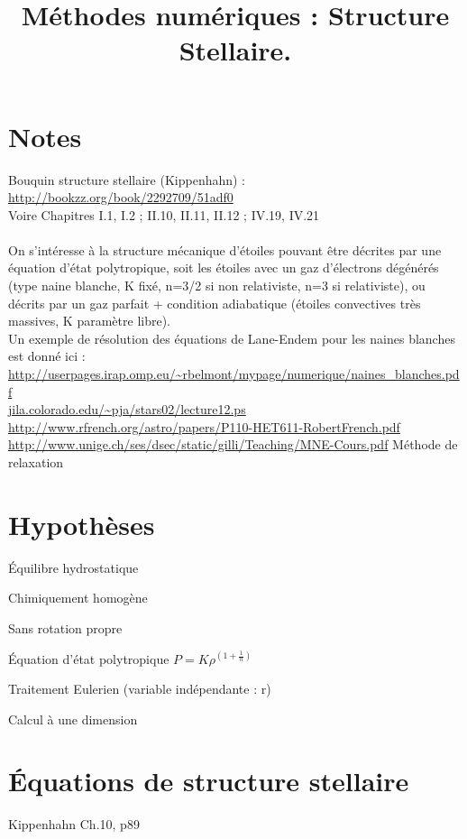 \documentclass[a4paper,10pt]{article}
\begin{document}
\title{Méthodes numériques : Structure Stellaire.}
\maketitle
\tableofcontents

\section*{Notes}
Bouquin structure stellaire (Kippenhahn) :\\
\url{http://bookzz.org/book/2292709/51adf0}\\
Voire Chapitres I.1, I.2 ; II.10, II.11, II.12 ; IV.19, IV.21\\
\\
On s'intéresse à la structure mécanique d'étoiles pouvant être décrites par une équation d'état polytropique, soit les étoiles avec un gaz d'électrons dégénérés (type naine blanche, K fixé, n=3/2 si non relativiste, n=3 si relativiste), ou décrits par un gaz parfait + condition adiabatique (étoiles convectives très massives, K paramètre libre).\\
\newpage
Un exemple de résolution des équations de Lane-Endem pour les naines blanches est donné ici : \url{http://userpages.irap.omp.eu/~rbelmont/mypage/numerique/naines_blanches.pdf}\\
\url	{jila.colorado.edu/~pja/stars02/lecture12.ps}\\
\url{http://www.rfrench.org/astro/papers/P110-HET611-RobertFrench.pdf}\\
\url{http://www.unige.ch/ses/dsec/static/gilli/Teaching/MNE-Cours.pdf} Méthode de relaxation \\


\section{Hypothèses}
\begin{list}{•}{}
\item Équilibre hydrostatique
\item Chimiquement homogène
\item Sans rotation propre
\item Équation d'état polytropique $ P = K \rho^{(1+\frac{1}{n})} $
\item Traitement Eulerien (variable indépendante : r)
\item Calcul à une dimension
\end{list}

\section{Équations de structure stellaire}
Kippenhahn Ch.10, p89
\end{document}
